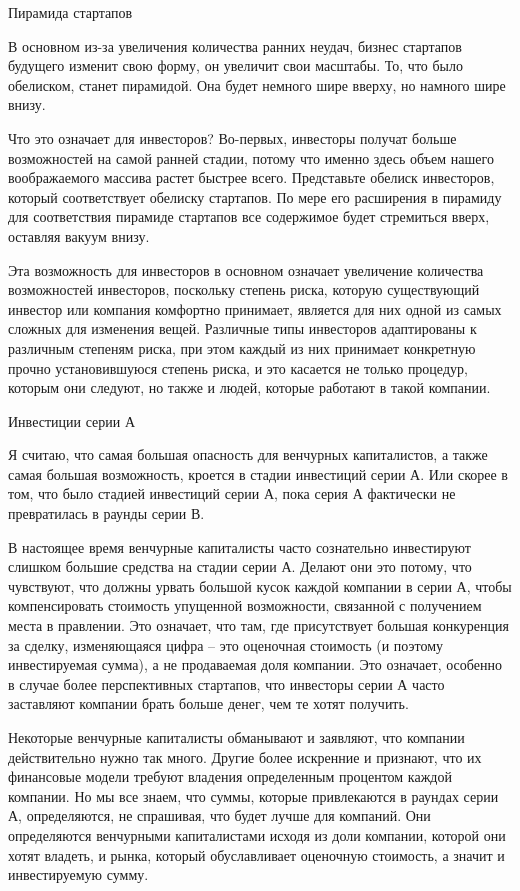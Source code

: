 \documentclass[ebook,12pt,oneside,openany]{memoir}
\begin{document}
Пирамида стартапов

В основном из-за увеличения количества ранних неудач, бизнес стартапов
будущего изменит свою форму, он увеличит свои масштабы. То, что было
обелиском, станет пирамидой. Она будет немного шире вверху, но намного
шире внизу.

Что это означает для инвесторов? Во-первых, инвесторы получат больше
возможностей на самой ранней стадии, потому что именно здесь объем
нашего воображаемого массива растет быстрее всего. Представьте обелиск
инвесторов, который соответствует обелиску стартапов. По мере его
расширения в пирамиду для соответствия пирамиде стартапов все
содержимое будет стремиться вверх, оставляя вакуум внизу.

Эта возможность для инвесторов в основном означает увеличение
количества возможностей инвесторов, поскольку степень риска, которую
существующий инвестор или компания комфортно принимает, является для
них одной из самых сложных для изменения вещей. Различные типы
инвесторов адаптированы к различным степеням риска, при этом каждый из
них принимает конкретную прочно установившуюся степень риска, и это
касается не только процедур, которым они следуют, но также и людей,
которые работают в такой компании.

Инвестиции серии А

Я считаю, что самая большая опасность для венчурных капиталистов, а
также самая большая возможность, кроется в стадии инвестиций серии А.
Или скорее в том, что было стадией инвестиций серии А, пока серия А
фактически не превратилась в раунды серии В.

В настоящее время венчурные капиталисты часто сознательно инвестируют
слишком большие средства на стадии серии А. Делают они это потому, что
чувствуют, что должны урвать большой кусок каждой компании в серии А,
чтобы компенсировать стоимость упущенной возможности, связанной с
получением места в правлении. Это означает, что там, где присутствует
большая конкуренция за сделку, изменяющаяся цифра – это оценочная
стоимость (и поэтому инвестируемая сумма), а не продаваемая доля
компании. Это означает, особенно в случае более перспективных
стартапов, что инвесторы серии А часто заставляют компании брать
больше денег, чем те хотят получить.

Некоторые венчурные капиталисты обманывают и заявляют, что компании
действительно нужно так много. Другие более искренние и признают, что
их финансовые модели требуют владения определенным процентом каждой
компании. Но мы все знаем, что суммы, которые привлекаются в раундах
серии А, определяются, не спрашивая, что будет лучше для компаний. Они
определяются венчурными капиталистами исходя из доли компании, которой
они хотят владеть, и рынка, который обуславливает оценочную стоимость,
а значит и инвестируемую сумму.
\end{document}
